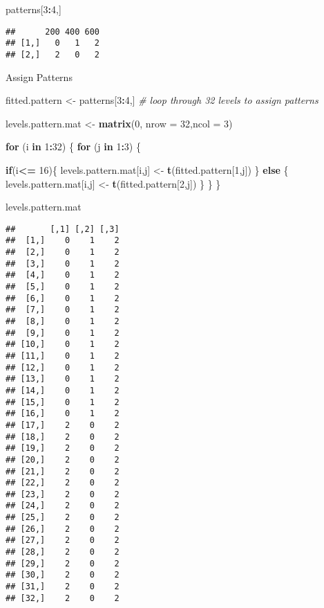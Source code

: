 \documentclass[
]{article}
\newenvironment{Shaded}{\begin{snugshade}}{\end{snugshade}}
\newcommand{\CommentTok}[1]{\textcolor[rgb]{0.56,0.35,0.01}{\textit{#1}}}
\newcommand{\ControlFlowTok}[1]{\textcolor[rgb]{0.13,0.29,0.53}{\textbf{#1}}}
\newcommand{\DataTypeTok}[1]{\textcolor[rgb]{0.13,0.29,0.53}{#1}}
\newcommand{\DecValTok}[1]{\textcolor[rgb]{0.00,0.00,0.81}{#1}}
\newcommand{\KeywordTok}[1]{\textcolor[rgb]{0.13,0.29,0.53}{\textbf{#1}}}
\newcommand{\NormalTok}[1]{#1}
\newcommand{\OperatorTok}[1]{\textcolor[rgb]{0.81,0.36,0.00}{\textbf{#1}}}
\newcommand{\StringTok}[1]{\textcolor[rgb]{0.31,0.60,0.02}{#1}}
\begin{document}
\begin{Shaded}
\begin{Highlighting}[]
\NormalTok{patterns[}\DecValTok{3}\OperatorTok{:}\DecValTok{4}\NormalTok{,]}
\end{Highlighting}
\end{Shaded}

\begin{verbatim}
##      200 400 600
## [1,]   0   1   2
## [2,]   2   0   2
\end{verbatim}

Assign Patterns

\begin{Shaded}
\begin{Highlighting}[]
\NormalTok{fitted.pattern <-}\StringTok{ }\NormalTok{patterns[}\DecValTok{3}\OperatorTok{:}\DecValTok{4}\NormalTok{,]}
\CommentTok{# loop through 32 levels to assign patterns}

\NormalTok{levels.pattern.mat <-}\StringTok{ }\KeywordTok{matrix}\NormalTok{(}\DecValTok{0}\NormalTok{,  }\DataTypeTok{nrow =} \DecValTok{32}\NormalTok{,}\DataTypeTok{ncol =} \DecValTok{3}\NormalTok{)}

\ControlFlowTok{for}\NormalTok{ (i }\ControlFlowTok{in} \DecValTok{1}\OperatorTok{:}\DecValTok{32}\NormalTok{) \{}
  \ControlFlowTok{for}\NormalTok{ (j }\ControlFlowTok{in} \DecValTok{1}\OperatorTok{:}\DecValTok{3}\NormalTok{) \{}
    
  \ControlFlowTok{if}\NormalTok{(i}\OperatorTok{<=}\StringTok{ }\DecValTok{16}\NormalTok{)\{}
\NormalTok{    levels.pattern.mat[i,j] <-}\StringTok{ }\KeywordTok{t}\NormalTok{(fitted.pattern[}\DecValTok{1}\NormalTok{,j])}
\NormalTok{  \} }\ControlFlowTok{else}\NormalTok{ \{}
\NormalTok{     levels.pattern.mat[i,j] <-}\StringTok{ }\KeywordTok{t}\NormalTok{(fitted.pattern[}\DecValTok{2}\NormalTok{,j])}
\NormalTok{   \}}
\NormalTok{  \}}
\NormalTok{\}}


\NormalTok{levels.pattern.mat}
\end{Highlighting}
\end{Shaded}

\begin{verbatim}
##       [,1] [,2] [,3]
##  [1,]    0    1    2
##  [2,]    0    1    2
##  [3,]    0    1    2
##  [4,]    0    1    2
##  [5,]    0    1    2
##  [6,]    0    1    2
##  [7,]    0    1    2
##  [8,]    0    1    2
##  [9,]    0    1    2
## [10,]    0    1    2
## [11,]    0    1    2
## [12,]    0    1    2
## [13,]    0    1    2
## [14,]    0    1    2
## [15,]    0    1    2
## [16,]    0    1    2
## [17,]    2    0    2
## [18,]    2    0    2
## [19,]    2    0    2
## [20,]    2    0    2
## [21,]    2    0    2
## [22,]    2    0    2
## [23,]    2    0    2
## [24,]    2    0    2
## [25,]    2    0    2
## [26,]    2    0    2
## [27,]    2    0    2
## [28,]    2    0    2
## [29,]    2    0    2
## [30,]    2    0    2
## [31,]    2    0    2
## [32,]    2    0    2
\end{verbatim}
\end{document}
